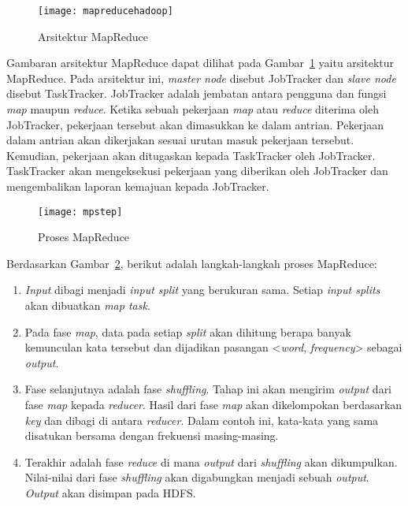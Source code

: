 \begin{figure}[H]
    \centering  
    \texttt{[image: mapreducehadoop]}  
    \caption[Arsitektur MapReduce]{Arsitektur MapReduce} 
    \label{fig:mapreducehadoop} 
\end{figure}

Gambaran arsitektur MapReduce dapat dilihat pada Gambar~\ref{fig:mapreducehadoop} yaitu arsitektur MapReduce. Pada arsitektur ini, \textit{master node} disebut JobTracker dan \textit{slave node} disebut TaskTracker. JobTracker adalah jembatan antara pengguna dan fungsi \textit{map} maupun \textit{reduce}. Ketika sebuah pekerjaan \textit{map} atau \textit{reduce} diterima oleh JobTracker, pekerjaan tersebut akan dimasukkan ke dalam antrian. Pekerjaan dalam antrian akan dikerjakan sesuai urutan masuk pekerjaan tersebut. Kemudian, pekerjaan akan ditugaskan kepada TaskTracker oleh JobTracker. TaskTracker akan mengeksekusi pekerjaan yang diberikan oleh JobTracker dan mengembalikan laporan kemajuan kepada JobTracker.   


\begin{figure}[H]
    \centering  
    \texttt{[image: mpstep]}  
    \caption[Proses MapReduce]{Proses MapReduce} 
    \label{fig:mpstep} 
\end{figure}

Berdasarkan Gambar~\ref{fig:mpstep}, berikut adalah langkah-langkah proses  MapReduce:

\begin{enumerate}
\item \textit{Input} dibagi menjadi \textit{input split} yang berukuran sama. Setiap \textit{input splits} akan dibuatkan \textit{map task}.

\item Pada fase \textit{map}, data pada setiap \textit{split} akan dihitung berapa banyak kemunculan kata tersebut dan dijadikan pasangan <\textit{word}, \textit{frequency}> sebagai \textit{output}.

\item Fase selanjutnya adalah fase \textit{shuffling}. Tahap ini akan mengirim \textit{output} dari fase \textit{map} kepada \textit{reducer}. Hasil dari fase \textit{map} akan dikelompokan berdasarkan \textit{key} dan dibagi di antara \textit{reducer}. Dalam contoh ini, kata-kata yang sama disatukan bersama dengan frekuensi masing-masing.


\item Terakhir adalah fase \textit{reduce} di mana \textit{output} dari \textit{shuffling} akan dikumpulkan. Nilai-nilai dari fase \textit{shuffling} akan digabungkan menjadi sebuah \textit{output}. \textit{Output} akan disimpan pada HDFS.

\end{enumerate}

